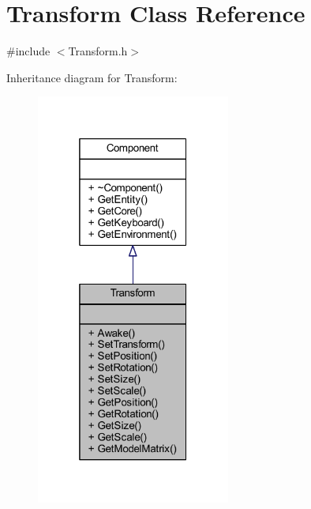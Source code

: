 \hypertarget{class_transform}{}\section{Transform Class Reference}
\label{class_transform}


{\ttfamily \#include $<$Transform.\+h$>$}



Inheritance diagram for Transform\+:
\nopagebreak
\begin{figure}[H]
\begin{center}
\leavevmode
\includegraphics[width=181pt]{class_transform__inherit__graph}
\end{center}
\end{figure}


